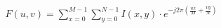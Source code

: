\documentclass[preview]{standalone}
\begin{document}
\begin{align*}
F(u,v) = \sum_{x=0}^{M-1} \sum_{y=0}^{N-1} I(x,y) \cdot e^{-j2\pi\left(\frac{ux}{M} + \frac{vy}{N}\right)}
\end{align*}
\end{document}
